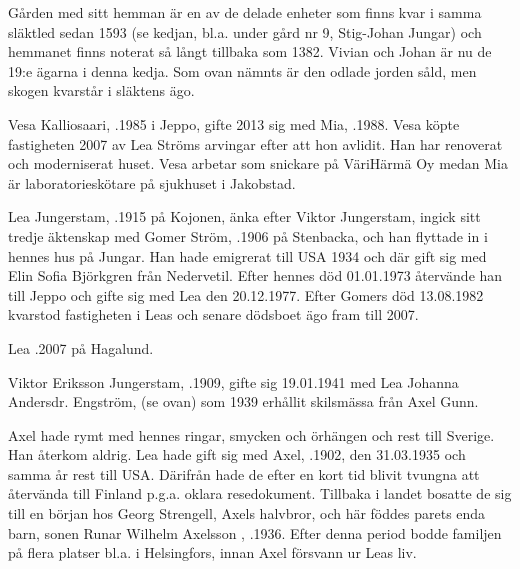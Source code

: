 Gården med sitt hemman är en av de delade enheter som finns kvar i samma släktled sedan 1593 (se kedjan, bl.a. under gård nr 9, Stig-Johan Jungar) och hemmanet finns noterat så långt tillbaka som 1382. Vivian och Johan är nu de 19:e ägarna i denna kedja. Som ovan nämnts är den odlade jorden såld, men skogen kvarstår i släktens ägo.



Vesa Kalliosaari, .1985 i Jeppo, gifte 2013 sig med Mia, .1988. Vesa köpte fastigheten 2007 av Lea Ströms arvingar efter att hon avlidit. Han har renoverat och moderniserat huset. Vesa arbetar som snickare på VäriHärmä Oy medan Mia är laboratorieskötare  på sjukhuset i Jakobstad.
\begin{jhchildren}
  \item {}
  \item {}
\end{jhchildren}

Lea Jungerstam, .1915 på Kojonen, änka efter Viktor Jungerstam, ingick sitt tredje äktenskap med Gomer Ström, .1906 på Stenbacka, och han flyttade in i hennes hus på Jungar. Han hade emigrerat till USA 1934 och där gift sig med Elin Sofia Björkgren från Nedervetil. Efter hennes död 01.01.1973 återvände han till Jeppo och gifte sig med Lea den 20.12.1977. Efter Gomers död 13.08.1982 kvarstod fastigheten i Leas och senare dödsboet ägo fram till 2007.

Lea .2007 på Hagalund.


Viktor Eriksson Jungerstam, .1909, gifte sig 19.01.1941 med Lea Johanna Andersdr. Engström,  (se ovan) som 1939 erhållit skilsmässa från Axel Gunn.

Axel hade rymt med hennes ringar, smycken och örhängen och rest till Sverige. Han återkom aldrig. Lea hade gift sig med Axel, .1902, den 31.03.1935 och samma år rest till USA. Därifrån hade de efter en kort tid blivit tvungna att återvända till Finland p.g.a. oklara resedokument. Tillbaka i landet bosatte de sig till en början hos Georg Strengell, Axels halvbror, och här föddes parets enda barn, sonen Runar Wilhelm Axelsson , .1936. Efter denna period bodde familjen på flera platser bl.a. i Helsingfors, innan Axel försvann ur Leas liv.

